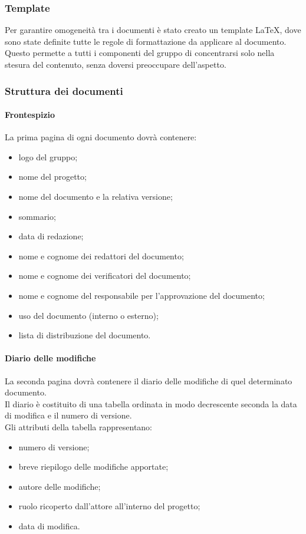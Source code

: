 \subsubsection{Template}
Per garantire omogeneità tra i documenti è stato creato un template \LaTeX, dove sono state definite tutte le regole di formattazione da applicare al documento. Questo permette a tutti i componenti del gruppo di concentrarsi solo nella stesura del contenuto, senza doversi preoccupare dell'aspetto. 
\subsubsection{Struttura dei documenti}
 \paragraph{Frontespizio} 
La prima pagina di ogni documento dovrà contenere:
\begin{itemize}
	\item logo del gruppo;
	\item nome del progetto;
	\item nome del documento e la relativa versione;
	\item sommario;
	\item data di redazione;
	\item nome e cognome dei redattori del documento;
	\item nome e cognome dei verificatori del documento;
	\item nome e cognome del responsabile per l'approvazione del documento;
	\item uso del documento (interno o esterno);
	\item lista di distribuzione del documento.
\end{itemize}
 \paragraph{Diario delle modifiche}
 La seconda pagina dovrà contenere il diario delle modifiche di quel determinato documento.\\
 Il diario è costituito di una tabella ordinata in modo decrescente seconda la data di modifica e il numero di versione.\\
 Gli attributi della tabella rappresentano:
 \begin{itemize}
 	\item numero di versione;
 	\item breve riepilogo delle modifiche apportate;
 	\item autore delle modifiche;
 	\item ruolo ricoperto dall'attore all'interno del progetto;
 	\item data di modifica.
 \end{itemize}
